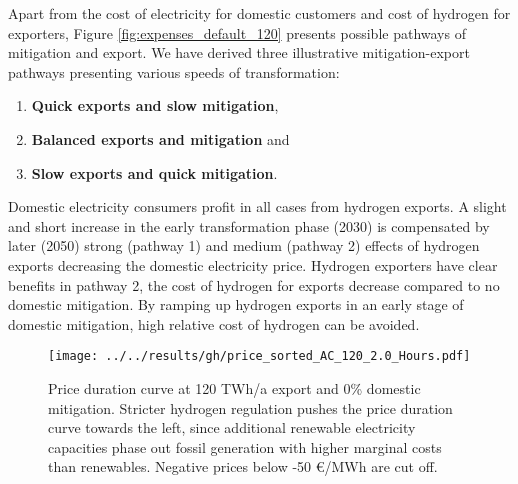Apart from the cost of electricity for domestic customers and cost of hydrogen for exporters, Figure \ref{fig:expenses_default_120} presents possible pathways of mitigation and export. We have derived three illustrative mitigation-export pathways presenting various speeds of transformation:
\begin{enumerate}
    \item \textbf{Quick exports and slow mitigation},
    \item \textbf{Balanced exports and mitigation} and
    \item \textbf{Slow exports and quick mitigation}.
\end{enumerate}

Domestic electricity consumers profit in all cases from hydrogen exports. A slight and short increase in the early transformation phase (2030) is compensated by later (2050) strong (pathway 1) and medium (pathway 2) effects of hydrogen exports decreasing the domestic electricity price. Hydrogen exporters have clear benefits in pathway 2, the cost of hydrogen for exports decrease compared to no domestic mitigation. By ramping up hydrogen exports in an early stage of domestic mitigation, high relative cost of hydrogen can be avoided.


\begin{figure}[h!]
    \centering
    \texttt{[image: ../../results/gh/price\_sorted\_AC\_120\_2.0\_Hours.pdf]}
    \caption{Price duration curve at 120 TWh/a export and 0\% domestic mitigation. Stricter hydrogen regulation pushes the price duration curve towards the left, since additional renewable electricity capacities phase out fossil generation with higher marginal costs than renewables. Negative prices below -50 €/MWh are cut off.}
    \label{fig:pdc-120-0}
\end{figure}



